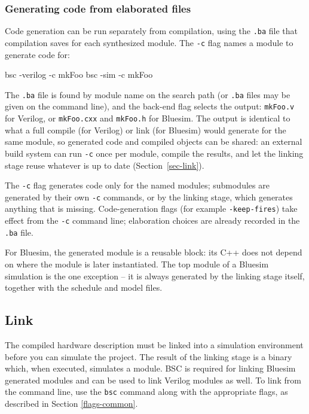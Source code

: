 \documentclass{article}
\newcommand{\te}[1]{\texttt{#1}}
\newenvironment{centerboxverbatim}
  {\center
   \boxedverbatim}
  {\endboxedverbatim
  {\endcenter }}
\begin{document}

\subsubsection{Generating code from elaborated files}
\label{sec-codegen-mode}
\index{-c@\te{-c} (compiler flag)}

Code generation can be run separately from compilation, using the
\te{.ba} file that compilation saves for each synthesized module.  The
\te{-c} flag names a module to generate code for:

\begin{centerboxverbatim}
bsc -verilog -c mkFoo
bsc -sim -c mkFoo
\end{centerboxverbatim}

The \te{.ba} file is found by module name on the search path (or
\te{.ba} files may be given on the command line), and the back-end
flag selects the output: \te{mkFoo.v} for Verilog, or \te{mkFoo.cxx}
and \te{mkFoo.h} for Bluesim.  The output is identical to what a full
compile (for Verilog) or link (for Bluesim) would generate for the
same module, so generated code and compiled objects can be shared: an
external build system can run \te{-c} once per module, compile the
results, and let the linking stage reuse whatever is up to date
(Section~\ref{sec-link}).

The \te{-c} flag generates code only for the named modules; submodules
are generated by their own \te{-c} commands, or by the linking stage,
which generates anything that is missing.  Code-generation flags (for
example \te{-keep-fires}) take effect from the \te{-c} command line;
elaboration choices are already recorded in the \te{.ba} file.

For Bluesim, the generated module is a reusable block: its C++ does
not depend on where the module is later instantiated.  The top module
of a Bluesim simulation is the one exception -- it is always generated
by the linking stage itself, together with the schedule and model
files.


\subsection{Link}
\label{sec-link}

The compiled  hardware description  must be linked into a simulation
environment before you can simulate the project.  The result of the linking
stage is a binary which, when executed,
simulates a module.
BSC is required for linking  Bluesim generated modules and can
be used to link Verilog modules as well.
To link from the command line, use the \te{bsc}
command along with the appropriate flags, as described in Section \ref{flags-common}.
\end{document}
